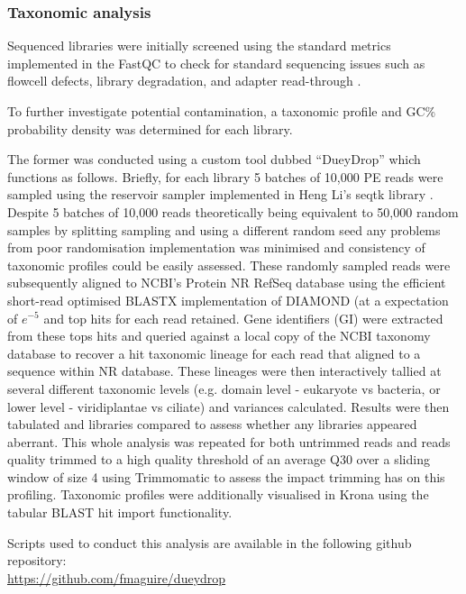 \subsubsection{Taxonomic analysis}
Sequenced libraries were initially screened using the standard
metrics implemented in the FastQC to check for standard sequencing issues
such as flowcell defects, library degradation, and adapter read-through \citep{fastqc2015}.

To further investigate potential contamination, a taxonomic
profile and GC\% probability density was determined for each library.

The former was conducted using a custom tool dubbed ``DueyDrop'' which functions as follows.
Briefly, for each library 5 batches of 10,000 PE reads were sampled 
using the reservoir sampler \citep{Vitter1985} implemented in Heng Li's seqtk library \citep{SeqtkGitHub}.
Despite 5 batches of 10,000 reads theoretically being equivalent to 50,000 random samples by splitting
sampling and using a different random seed any problems from poor randomisation implementation 
was minimised and consistency of taxonomic profiles could be easily assessed.
These randomly sampled reads were subsequently aligned to NCBI's Protein NR RefSeq database \citep{Pruitt2007}
using the efficient short-read optimised BLASTX implementation of DIAMOND \citep{Buchfink2015} (at a expectation
    of \(e^{-5}\) and top hits for each read retained.  Gene identifiers (GI) were extracted from these tops hits and queried against a
local copy of the NCBI taxonomy database \citep{Federhen2012} to recover a hit taxonomic lineage for each
read that aligned to a sequence within NR database. These lineages were then interactively tallied 
at several different taxonomic levels (e.g. domain level - eukaryote vs bacteria, or lower level - viridiplantae vs ciliate) and variances
calculated.  Results were then tabulated and libraries compared to assess whether any libraries appeared
aberrant.  This whole analysis was repeated for both untrimmed reads and reads quality trimmed
to a high quality threshold of an average Q30 over a sliding window of size 4 using
Trimmomatic \citep{Bolger2014a} to assess the impact trimming has on this profiling.
Taxonomic profiles were additionally visualised in Krona \citep{Ondov2011} using
the tabular BLAST hit import functionality.

Scripts used to conduct this analysis are available in the following github repository:\\
\url{https://github.com/fmaguire/dueydrop}

